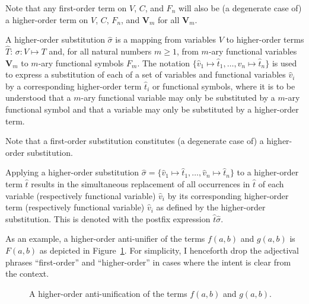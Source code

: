 Note that any first-order term on $V$, $C$, and $F_n$ will also be (a degenerate case of) a higher-order term on $V$, $C$, $F_n$, and $\mathbf{V}_m$ for all $\mathbf{V}_m$.
 
\begin{defn}\label{def:substitution}
A higher-order substitution $\hat{\sigma}$ is a mapping from variables $V$ to higher-order terms $\hat{T}$: $\sigma: V\mapsto T$ and, for all natural numbers $m\ge1$, from $m$-ary functional variables $\mathbf{V}_m$ to $m$-ary functional symbols $F_m$. The notation $\{\hat{v}_1 \mapsto \hat{t}_1, \ldots, \hat{v}_n \mapsto \hat{t}_n\}$ is used to express a substitution of each of a set of variables and functional variables $\hat{v}_i$ by a corresponding higher-order term $\hat{t}_i$ or functional symbols, where it is to be understood that a $m$-ary functional variable may only be substituted by a $m$-ary functional symbol and that a variable may only be substituted by a higher-order term.
\end{defn}

Note that a first-order substitution constitutes (a degenerate case of) a higher-order substitution.

\begin{defn}\label{def:substitution}
Applying a higher-order substitution $\hat{\sigma} = \{\hat{v}_1 \mapsto \hat{t}_1, \ldots, \hat{v}_n \mapsto \hat{t}_n\}$ to a higher-order term $\hat{t}$ results in the simultaneous replacement of all occurrences in $\hat{t}$ of each variable (respectively functional variable) $\hat{v}_i$ by its corresponding higher-order term (respectively functional variable) $\hat{v}_i$ as defined by the higher-order substitution. This is denoted with the postfix expression $\hat{t}\hat{\sigma}$.
\end{defn}

As an example, a higher-order anti-unifier of the terms $f(a,b)$ and $g(a,b)$ is $F(a,b)$ as depicted in Figure~\ref{fig:higher-anti-uni}.   For simplicity, I henceforth drop the adjectival phrases ``first-order'' and ``higher-order'' in cases where the intent is clear from the context.

\begin{figure}[t]
\centering{}
\caption{A higher-order anti-unification of the terms $f(a,b)$ and $g(a,b)$.\label{fig:higher-anti-uni}}
\end{figure}

